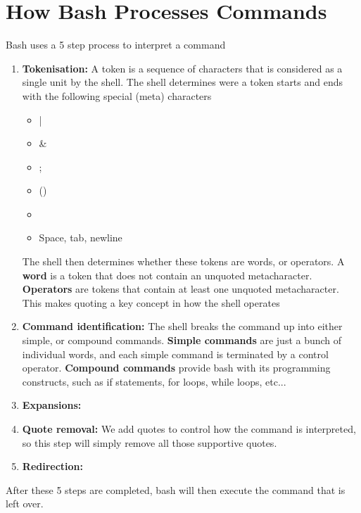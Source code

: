 \documentclass{report}
\begin{document}
    \section{\LARGE How Bash Processes Commands}
    \bigbreak \noindent 
    Bash uses a 5 step process to interpret a command
    \bigbreak \noindent 
    \begin{enumerate}
        \item \textbf{Tokenisation:} A token is a sequence of characters that is considered as a single unit by the shell. The shell determines were a token starts and ends with the following special (meta) characters
            \begin{itemize}
                \item |
                \item \&
                \item ;
                \item ()
                \item < >
                \item Space, tab, newline
            \end{itemize}
            The shell then determines whether these tokens are words, or operators. A \textbf{word} is a token that does not contain an unquoted metacharacter. \textbf{Operators} are tokens that contain at least one unquoted metacharacter. This makes quoting a key concept in how the shell operates
        \item \textbf{Command identification:} The shell breaks the command up into either simple, or compound commands. \textbf{Simple commands} are just a bunch of individual words, and each simple command is terminated by a control operator. \textbf{Compound commands} provide bash with its programming constructs, such as if statements, for loops, while loops, etc...
        \item \textbf{Expansions:}
        \item \textbf{Quote removal:} We add quotes to control how the command is interpreted, so this step will simply remove all those supportive quotes.
        \item \textbf{Redirection:}
    \end{enumerate}
    After these 5 steps are completed, bash will then execute the command that is left over.

    \bigbreak \noindent 
\end{document}
